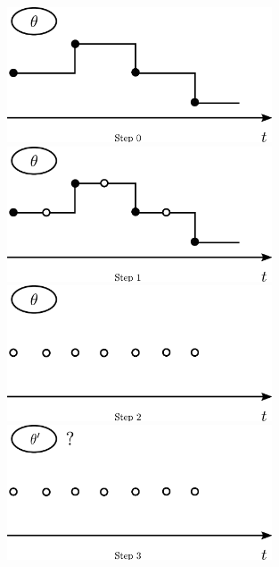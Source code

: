 \setlength{\unitlength}{0.8cm}
  \begin{figure}[H]
  \centering
  \begin{minipage}[!hp]{0.45\linewidth}
  \centering
    \includegraphics [width=0.70\textwidth, angle=0]{figs/plotn0.pdf}
      \end{minipage}
  \begin{minipage}[!hp]{0.45\linewidth}
  \centering
    \includegraphics [width=0.70\textwidth, angle=0]{figs/plotn1.pdf}
    \vspace{-0 in}
  \end{minipage}
  \begin{minipage}[!hp]{0.45\linewidth}
  \centering
    \includegraphics [width=0.70\textwidth, angle=0]{figs/plotn2.pdf}
    \vspace{-0 in}
  \end{minipage}
  \begin{minipage}[!hp]{0.45\linewidth}
  \centering
    \includegraphics [width=0.70\textwidth, angle=0]{figs/plotn3.pdf}

\end{minipage}
\end{figure}
